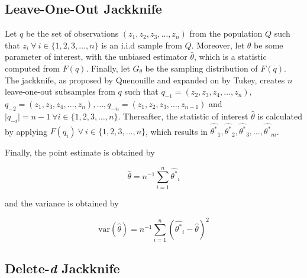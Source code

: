 \documentclass[
  letterpaper,
  DIV=11,
  numbers=noendperiod]{scrreprt}
\begin{document}
\hypertarget{sec-del}{%
\subsection{Leave-One-Out Jackknife}\label{sec-del}}

Let \(q\) be the set of observations
\(\left(z_1, z_2, z_3, \dots, z_n \right)\) from the population \(Q\)
such that \(z_i \ \forall \ i \in \{1, 2, 3, \dots, n\}\) is an i.i.d
sample from \(Q\). Moreover, let \(\theta\) be some parameter of
interest, with the unbiased estimator \(\hat{\theta}\), which is a
statistic computed from \(F(q)\). Finally, let \(G_{\theta}\) be the
sampling distribution of \(F(q)\). The jackknife, as proposed by
Quenouille and expanded on by Tukey, creates \(n\) leave-one-out
subsamples from \(q\) such that
\(q_{-1} = \left(z_2, z_3, z_4, \dots, z_n \right),\)
\(q_{-2} = \left(z_1, z_3, z_4, \dots, z_n \right), \dots, q_{-n} = \left(z_1, z_2, z_3, \dots, z_{n-1} \right)\)
and \(\lvert q_{-i}\rvert = n-1 \ \forall i \in \{1, 2, 3, \dots, n\}\).
Thereafter, the statistic of interest \(\hat{\theta}\) is calculated by
applying \(F(q_i) \ \forall \ i \in \{1, 2, 3, \dots, n\}\), which
results in
\(\hat{\theta^*}_1, \hat{\theta^*}_2, \hat{\theta^*}_3, \dots, \hat{\theta^*}_m\).

Finally, the point estimate is obtained by

\[
\hat{\theta} = n^{-1}\sum^n_{i = 1} \hat{\theta^*}_i
\]

and the variance is obtained by

\[
\text{var}(\hat{\theta}) = n^{-1}\sum^n_{i = 1} \left(\hat{\theta^*}_i - \hat{\theta}\right)^2
\]

\hypertarget{delete-d-jackknife}{%
\subsection{\texorpdfstring{Delete-\emph{d}
Jackknife}{Delete-d Jackknife}}\label{delete-d-jackknife}}
\end{document}
